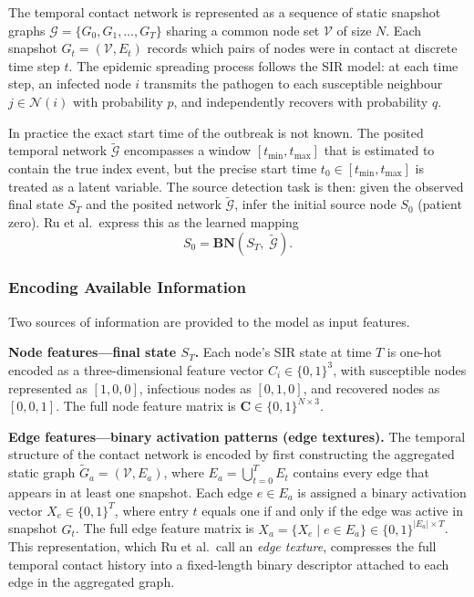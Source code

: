 The temporal contact network is represented as a sequence of static snapshot graphs $\mathcal{G} = \{G_0, G_1, \ldots, G_T\}$ sharing a common node set $\mathcal{V}$ of size $N$. Each snapshot $G_t = (\mathcal{V}, E_t)$ records which pairs of nodes were in contact at discrete time step $t$. The epidemic spreading process follows the SIR model: at each time step, an infected node $i$ transmits the pathogen to each susceptible neighbour $j \in \mathcal{N}(i)$ with probability $p$, and independently recovers with probability $q$.

In practice the exact start time of the outbreak is not known. The posited temporal network $\tilde{\mathcal{G}}$ encompasses a window $[t_{\min}, t_{\max}]$ that is estimated to contain the true index event, but the precise start time $t_0 \in [t_{\min}, t_{\max}]$ is treated as a latent variable. The source detection task is then: given the observed final state $S_T$ and the posited network $\tilde{\mathcal{G}}$, infer the initial source node $S_0$ (patient zero). Ru et al.\ express this as the learned mapping
\[
    S_0 = \mathbf{BN}(S_T,\; \tilde{\mathcal{G}}).
\]

\subsubsection{Encoding Available Information}
\label{sssec:bn-encoding}

Two sources of information are provided to the model as input features.

\textbf{Node features---final state $S_T$.} Each node's SIR state at time $T$ is one-hot encoded as a three-dimensional feature vector $C_i \in \{0,1\}^3$, with susceptible nodes represented as $[1, 0, 0]$, infectious nodes as $[0, 1, 0]$, and recovered nodes as $[0, 0, 1]$. The full node feature matrix is $\mathbf{C} \in \{0,1\}^{N \times 3}$.

\textbf{Edge features---binary activation patterns (edge textures).} The temporal structure of the contact network is encoded by first constructing the aggregated static graph $\tilde{G}_a = (\mathcal{V}, E_a)$, where $E_a = \bigcup_{t=0}^{T} E_t$ contains every edge that appears in at least one snapshot. Each edge $e \in E_a$ is assigned a binary activation vector $X_e \in \{0,1\}^T$, where entry $t$ equals one if and only if the edge was active in snapshot $G_t$. The full edge feature matrix is $X_a = \{X_e \mid e \in E_a\} \in \{0,1\}^{|E_a| \times T}$. This representation, which Ru et al.\ call an \textit{edge texture}, compresses the full temporal contact history into a fixed-length binary descriptor attached to each edge in the aggregated graph.

